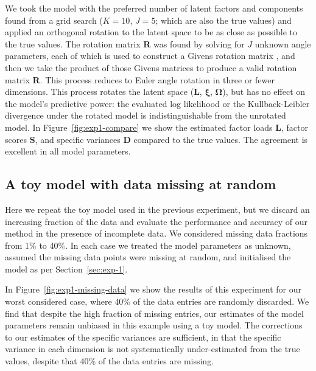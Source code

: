 \documentclass[twocolumn]{aastex62}
\newcommand{\vect}[1]{\boldsymbol{\mathbf{#1}}}
\renewcommand{\vec}[1]{\vect{#1}}
\newcommand{\factorloads}{\textbf{L}}
\newcommand{\factorscores}{\textbf{S}}
\newcommand{\specificvariance}{\vec{D}}
\newcommand{\scoremeans}{\vec\xi}
\newcommand{\scorecovs}{\vec\Omega}
\newcommand{\NumLatentFactors}{J}
\newcommand{\NumComponents}{K}
\begin{document}
We took the model with the preferred number of latent factors and components found
from a grid search ($\NumComponents = 10$, $\NumLatentFactors = 5$; which are also
the true values) and applied an orthogonal rotation to the latent space to be as
close as possible to the true values. The rotation matrix $\mathbf{R}$ was found
by solving for $\NumLatentFactors$ unknown angle parameters, each of which is used
to construct a Givens rotation matrix \citep{Givens:1958}, and then we take the product of those Givens
matrices to produce a valid rotation matrix $\vec{R}$. This process reduces to Euler angle rotation in three or fewer dimensions.
This process rotates the latent space
($\factorloads$, $\scoremeans$, $\scorecovs$), but has no effect on the model's 
predictive power: the evaluated log likelihood or the Kullback-Leibler divergence \citep{Kullback:1951} under the
rotated model is indistinguishable from the unrotated model.
In Figure~\ref{fig:exp1-compare} we show the estimated factor loads $\factorloads$,
factor scores $\factorscores$, and specific variances $\specificvariance$ compared
to the true values. The agreement is excellent in all model parameters.


 




\subsection{A toy model with data missing at random}
\label{sec:toy-model-missing-data}

Here we repeat the toy model used in the previous experiment, but we discard an increasing fraction
of the data and evaluate the performance and accuracy of our method in the presence
of incomplete data. We considered missing data fractions from 1\% to
40\%. In each case we treated the model parameters as unknown, assumed
the missing data points were missing at random, and initialised the
model as per Section~\ref{sec:exp-1}.


In Figure~\ref{fig:exp1-missing-data} we show the results of this
experiment for our worst considered case, where 40\% of the data
entries are randomly discarded. We find that despite the high fraction
of missing entries, our estimates of the model parameters remain unbiased
in this example using a toy model. The corrections to our estimates of the
specific variances are sufficient, in that the specific variance in each
dimension is not systematically under-estimated from the true values, 
despite that 40\% of the data entries are missing.
\end{document}
